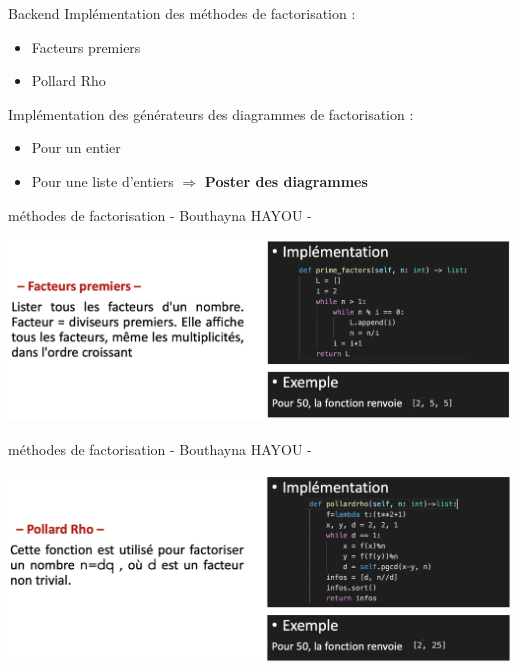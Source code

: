 \documentclass[aspectratio=169]{beamer}
\begin{document}
\begin{frame}[fragile=singleslide]{Backend}
	Implémentation des méthodes de factorisation :
	\begin{itemize}
		\item Facteurs premiers
		\item Pollard Rho
	\end{itemize}
	Implémentation des générateurs des diagrammes de factorisation :
	\begin{itemize}
		\item Pour un entier
		\item Pour une liste d'entiers $\Rightarrow$ \textbf{Poster des diagrammes}
	\end{itemize}
\end{frame}

\begin{frame}[fragile=singleslide]{méthodes de factorisation \qquad \qquad \qquad - Bouthayna HAYOU -}
\begin{center}
    \includegraphics[width=14 cm]{./res/pf.png}
\end{center}
\end{frame}

\begin{frame}[fragile=singleslide]{méthodes de factorisation \qquad \qquad \qquad - Bouthayna HAYOU -}
\begin{center}
    \includegraphics[width=14 cm]{./res/pr.png}
\end{center}
\end{frame}
\end{document}
